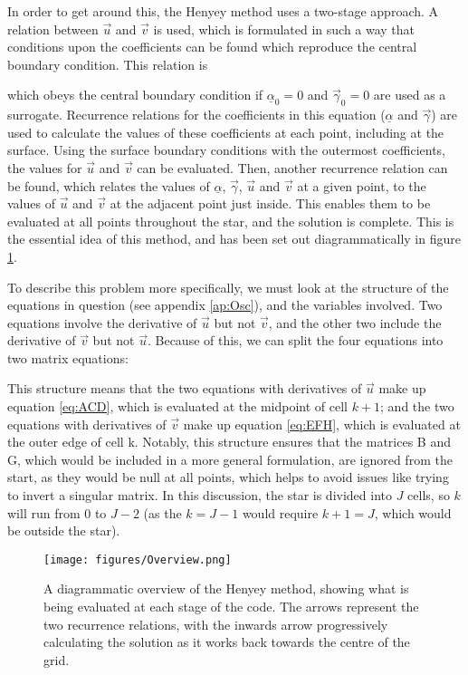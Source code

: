 \documentclass[11pt]{amsart}
\begin{document}
In order to get around this, the Henyey method uses a two-stage approach.  A relation between $\vec{u}$ and $\vec{v}$ is used, which is formulated in such a way that conditions upon the coefficients can be found which reproduce the central boundary condition.  This relation is


which obeys the central boundary condition if $\underline{\alpha}_{0} = 0$ and $\vec{\gamma}_{0} = 0$ are used as a surrogate.  Recurrence relations for the coefficients in this equation ($\underline{\alpha}$ and $\vec{\gamma}$) are used to calculate the values of these coefficients at each point, including at the surface.  Using the surface boundary conditions with the outermost coefficients, the values for $\vec{u}$ and $\vec{v}$ can be evaluated.  Then, another recurrence relation can be found, which relates the values of $\underline{\alpha}$, $\vec{\gamma}$, $\vec{u}$ and $\vec{v}$ at a given point, to the values of $\vec{u}$ and $\vec{v}$ at the adjacent point just inside.  This enables them to be evaluated at all points throughout the star, and the solution is complete.  This is the essential idea of this method, and has been set out diagrammatically in figure \ref{fig:overview}.

To describe this problem more specifically, we must look at the structure of the equations in question (see appendix \ref{ap:Osc}), and the variables involved.  Two equations involve the derivative of $\vec{u}$ but not $\vec{v}$, and the other two include the derivative of $\vec{v}$ but not $\vec{u}$.  Because of this, we can split the four equations into two matrix equations:



This structure means that the two equations with derivatives of $\vec{u}$ make up equation \ref{eq:ACD}, which is evaluated at the midpoint of cell $k+1$; and the two equations with derivatives of $\vec{v}$ make up equation \ref{eq:EFH}, which is evaluated at the outer edge of cell k.  Notably, this structure ensures that the matrices B and G, which would be included in a more general formulation, are ignored from the start, as they would be null at all points, which helps to avoid issues like trying to invert a singular matrix.  In this discussion, the star is divided into $J$ cells, so $k$ will run from $0$ to $J-2$ (as the $k = J-1$ would require $k+1 = J$, which would be outside the star).

\fi


\begin{figure}
\begin{center}
\texttt{[image: figures/Overview.png]}
\caption{A diagrammatic overview of the Henyey method, showing what is being evaluated at each stage of the code.  The arrows represent the two recurrence relations, with the inwards arrow progressively calculating the solution as it works back towards the centre of the grid.}
\label{fig:overview}
\end{center}
\end{figure}
\end{document}
